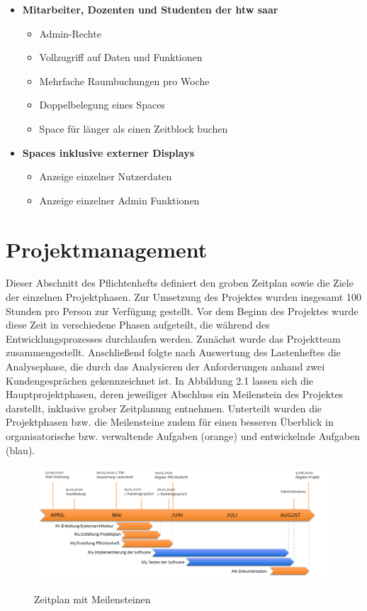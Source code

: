 \documentclass[a4paper,report,headsepline]{scrreprt}
\begin{document}
\begin{itemize}
\item \textbf{Mitarbeiter, Dozenten und Studenten der htw saar}
\begin{itemize}
\item Admin-Rechte 
\item Vollzugriff auf Daten und Funktionen
\item Mehrfache Raumbuchungen pro Woche 
\item Doppelbelegung eines Spaces 
\item Space für länger als einen Zeitblock buchen
\end{itemize}

\item \textbf{Spaces inklusive externer Displays}
\begin{itemize}
\item Anzeige einzelner Nutzerdaten
\item Anzeige einzelner Admin Funktionen
\end{itemize}

\end{itemize}





\chapter{Projektmanagement}\label{projektmanagement}

\renewcommand{\chapterpagestyle}{scrheadings}

Dieser Abschnitt des Pflichtenhefts definiert den groben Zeitplan sowie die Ziele der einzelnen Projektphasen. Zur Umsetzung des Projektes wurden insgesamt 100 Stunden pro Person zur Verfügung gestellt. Vor dem Beginn des Projektes wurde diese Zeit in verschiedene Phasen aufgeteilt, die während des Entwicklungsprozesses durchlaufen werden. Zunächst wurde das Projektteam zusammengestellt. Anschließend folgte nach Auswertung des Lastenheftes die Analysephase, die durch das Analysieren der Anforderungen anhand zwei Kundengesprächen gekennzeichnet ist. In Abbildung 2.1 lassen sich die Hauptprojektphasen, deren jeweiliger Abschluss ein Meilenstein des Projektes darstellt, inklusive grober Zeitplanung entnehmen. Unterteilt wurden die Projektphasen bzw. die Meilensteine zudem für einen besseren Überblick in organisatorische bzw. verwaltende Aufgaben (orange) und entwickelnde Aufgaben (blau).\\

\begin{figure}[h]
   \centering
   \caption{Zeitplan mit Meilensteinen}
   \includegraphics[width=1\textwidth]{Meilenstein}
   \label{fig:Zeitplan}
\end{figure}
\end{document}
